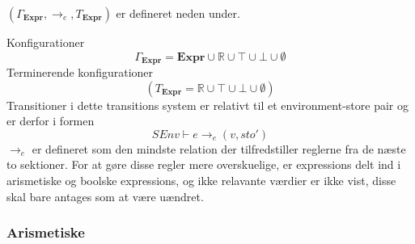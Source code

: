 $(\Gamma_\textbf{Expr},\to_e,T_\textbf{Expr})$ er defineret neden under.

Konfigurationer
\[
    \Gamma_\textbf{Expr} = \textbf{Expr} \cup \mathbb{R} \cup \top \cup \bot \cup \emptyset 
\]
Terminerende konfigurationer
\[
    (T_\textbf{Expr}=\mathbb{R}\cup\top\cup\bot\cup \emptyset)
\]
Transitioner i dette transitions system er relativt til et environment-store pair og er derfor i formen
\[
    SEnv \vdash e \to_e (v, sto')
\]
$\to_e$ er defineret som den mindste relation der tilfredstiller reglerne fra de næste to sektioner. For at gøre disse regler mere overskuelige, er expressions delt ind i arismetiske og boolske expressions, og ikke relavante værdier er ikke vist, disse skal bare antages som at være uændret.\\

\noindent \subsubsection{Arismetiske}
\label{ssec:aexpr}

